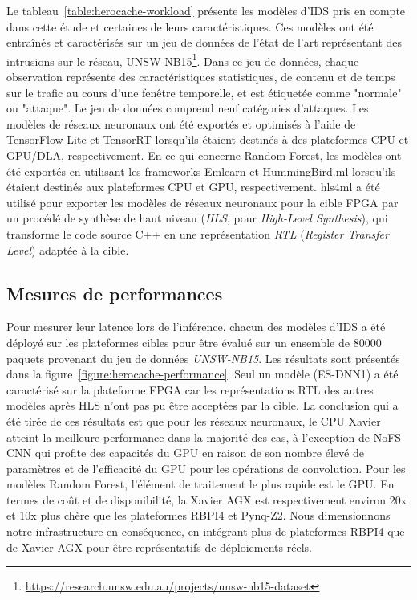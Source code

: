Le tableau~\ref{table:herocache-workload} présente les modèles d'IDS pris en compte dans cette étude et certaines de leurs caractéristiques. Ces modèles ont été entraînés et caractérisés sur un jeu de données de l'état de l'art représentant des intrusions sur le réseau, UNSW-NB15\footnote{\href{https://research.unsw.edu.au/projects/unsw-nb15-dataset}{https://research.unsw.edu.au/projects/unsw-nb15-dataset}}. Dans ce jeu de données, chaque observation représente des caractéristiques statistiques, de contenu et de temps sur le trafic au cours d'une fenêtre temporelle, et est étiquetée comme "normale" ou "attaque". Le jeu de données comprend neuf catégories d'attaques. Les modèles de réseaux neuronaux ont été exportés et optimisés à l'aide de TensorFlow Lite et TensorRT lorsqu'ils étaient destinés à des plateformes CPU et GPU/DLA, respectivement. En ce qui concerne Random Forest, les modèles ont été exportés en utilisant les frameworks Emlearn et HummingBird.ml lorsqu'ils étaient destinés aux plateformes CPU et GPU, respectivement. hls4ml a été utilisé pour exporter les modèles de réseaux neuronaux pour la cible FPGA par un procédé de synthèse de haut niveau (\textit{HLS}, pour \textit{High-Level Synthesis}), qui transforme le code source C++ en une représentation \textit{RTL} (\textit{Register Transfer Level}) adaptée à la cible.

\subsection{Mesures de performances}

Pour mesurer leur latence lors de l'inférence, chacun des modèles d'IDS a été déployé sur les plateformes cibles pour être évalué sur un ensemble de $80 000$ paquets provenant du jeu de données \textit{UNSW-NB15}. Les résultats sont présentés dans la figure~\ref{figure:herocache-performance}. Seul un modèle (ES-DNN1) a été caractérisé sur la plateforme FPGA car les représentations RTL des autres modèles après HLS n'ont pas pu être acceptées par la cible. La conclusion qui a été tirée de ces résultats est que pour les réseaux neuronaux, le CPU Xavier atteint la meilleure performance dans la majorité des cas, à l'exception de NoFS-CNN qui profite des capacités du GPU en raison de son nombre élevé de paramètres et de l'efficacité du GPU pour les opérations de convolution. Pour les modèles Random Forest, l'élément de traitement le plus rapide est le GPU. En termes de coût et de disponibilité, la Xavier AGX est respectivement environ 20x et 10x plus chère que les plateformes RBPI4 et Pynq-Z2. Nous dimensionnons notre infrastructure en conséquence, en intégrant plus de plateformes RBPI4 que de Xavier AGX pour être représentatifs de déploiements réels.

